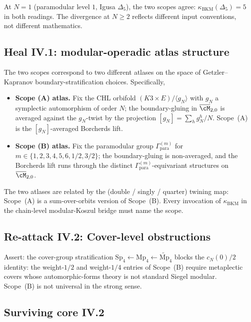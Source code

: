 At $N = 1$ (paramodular level $1$, Igusa $\Delta_5$), the two scopes
agree: $\kappa_{\mathrm{BKM}}(\Delta_5) = 5$ in both readings. The
divergence at $N \geq 2$ reflects different input conventions, not
different mathematics.

\subsection*{Heal IV.1: modular-operadic atlas structure}

The two scopes correspond to two different atlases on the space of
Getzler--Kapranov boundary-stratification choices. Specifically,
\begin{itemize}
\item \textbf{Scope (A) atlas.} Fix the CHL orbifold $(K3 \times E)/
\langle g_N \rangle$ with $g_N$ a symplectic automorphism of order $N$;
the boundary-gluing in $\overline{\cM}_{2, 0}$ is averaged against the
$g_N$-twist by the projection $[g_N] = \sum_h g_N^h / N$. Scope~(A) is
the $[g_N]$-averaged Borcherds lift.
\item \textbf{Scope (B) atlas.} Fix the paramodular group $\Gamma^{(m)}_{\mathrm{para}}$
for $m \in \{1, 2, 3, 4, 5, 6, 1/2, 3/2\}$; the boundary-gluing is
non-averaged, and the Borcherds lift runs through the distinct
$\Gamma^{(m)}_{\mathrm{para}}$-equivariant structures on
$\overline{\cM}_{2, 0}$.
\end{itemize}

The two atlases are related by the (double / singly / quarter) twining
map: Scope~(A) is a sum-over-orbits version of Scope~(B). Every
invocation of $\kappa_{\mathrm{BKM}}$ in the chain-level modular-Koszul
bridge must name the scope.

\subsection*{Re-attack IV.2: Cover-level obstructions}

Assert: the cover-group stratification $\mathrm{Sp}_4 \leftarrow \mathrm{Mp}_4
\leftarrow \widetilde{\mathrm{Mp}}_4$ blocks the $c_N(0)/2$ identity:
the weight-$1/2$ and weight-$1/4$ entries of Scope~(B) require
metaplectic covers whose automorphic-forms theory is not standard
Siegel modular. Scope~(B) is not universal in the strong sense.

\subsection*{Surviving core IV.2}

